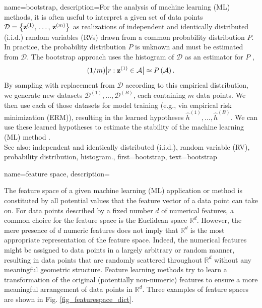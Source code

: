 {
{name={bootstrap},
	description={For the analysis of machine learning (ML) methods, it is often useful to interpret 
		a given set of data points $\mathcal{D} = \big\{ {\bf z}^{(1)}, \,\ldots, \,{\bf z}^{(m)}\big\}$ 
		as realizations of independent and identically distributed (i.i.d.) random variables (RVs) drawn from a common probability distribution $P$. 
		In practice, the probability distribution $P$ is unknown and must be estimated from $\mathcal{D}$. 
		The bootstrap approach uses the histogram of $\mathcal{D}$ as an estimator for 
		$P$ \cite{hastie01statisticallearning}, 
		$$ (1/m) \big| r: {\bf z}^{(1)} \in \mathcal{A} \big| \approx P\left(\mathcal{A}\right).$$
		By sampling with replacement from $\mathcal{D}$ according to this empirical distribution, 
		we generate new datasets 
		$\mathcal{D}^{(1)}, \ldots, \mathcal{D}^{(B)}$, each containing 
		$m$ data points. We then use each of those datasets 
		for model training (e.g., via empirical risk minimization (ERM)), 
		resulting in the learned hypotheses
		$\widehat{h}^{(1)}, \ldots, \hat{h}^{(B)}.$ 
        We can use these learned hypotheses to estimate the stability 
		of the machine learning (ML) method \cite{hastie01statisticallearning}.
		\\
		See also: independent and identically distributed (i.i.d.), random variable (RV), probability distribution, histogram.},
	first={bootstrap},
	text={bootstrap}  
}

{name={feature space},
	description={The feature space of a given machine learning (ML) application 
		or method is constituted by all potential values that the feature vector of a data point can take on. 
		For data points described by a fixed number $d$ of numerical features, 
		a common choice for the feature space is the Euclidean space $\mathbb{R}^{d}$. 
		However, the mere presence of $d$ numeric features does not imply that $\mathbb{R}^{d}$ 
		is the most appropriate representation of the feature space. Indeed, the numerical features  
		might be assigned to data points in a largely arbitrary or random manner, resulting 
		in data points that are randomly scattered throughout $\mathbb{R}^{d}$ 
		without any meaningful geometric structure. Feature learning methods try to learn a 
		transformation of the original (potentially non-numeric) features to ensure a 
		more meaningful arrangement of data points in $\mathbb{R}^{d}$. 
		Three examples of feature spaces are shown in Fig. \ref{fig_featurespace_dict}.
		\begin{figure}[H]
			\centering
			\begin{tikzpicture}[scale=0.6]
			

\end{tikzpicture}
\end{figure}}}}
